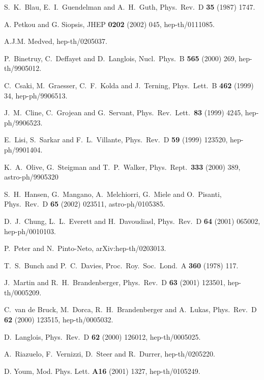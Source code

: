 \documentclass[a4paper,11pt]{article}
\begin{document}
\begin{thebibliography}{99}
S.~K.~Blau, E.~I.~Guendelman and A.~H.~Guth, Phys.\ Rev.\ D {\bf 35} (1987) 1747.

 A. Petkou and G. Siopsis, JHEP {\bf 0202} (2002) 045, 
hep-th/0111085.

 A.J.M. Medved, hep-th/0205037.

P.~Binetruy, C.~Deffayet and D.~Langlois,
Nucl.\ Phys.\ B {\bf 565} (2000) 269, hep-th/9905012.

C.~Csaki, M.~Graesser, C.~F.~Kolda and J.~Terning, Phys.\ Lett.\ B {\bf 462} (1999) 34, hep-ph/9906513.

J.~M.~Cline, C.~Grojean and G.~Servant, Phys.\ Rev.\ Lett.\ {\bf 83} (1999) 4245, hep-ph/9906523.

E.~Lisi, S.~Sarkar and F.~L.~Villante,
Phys.\ Rev.\ D {\bf 59} (1999) 123520, hep-ph/9901404.

K.~A.~Olive, G.~Steigman and T.~P.~Walker,
Phys.\ Rept.\  {\bf 333} (2000) 389, astro-ph/9905320

S.~H.~Hansen, G.~Mangano, A.~Melchiorri, G.~Miele and O.~Pisanti,
Phys.\ Rev.\ D {\bf 65} (2002) 023511, astro-ph/0105385.

D.~J.~Chung, L.~L.~Everett and H.~Davoudiasl, Phys.\ Rev.\ D {\bf 64}
(2001) 065002, hep-ph/0010103.

P.~Peter and N.~Pinto-Neto,
arXiv:hep-th/0203013.

T.~S.~Bunch and P.~C.~Davies,
Proc.\ Roy.\ Soc.\ Lond.\ A {\bf 360} (1978) 117.

J.~Martin and R.~H.~Brandenberger,
Phys.\ Rev.\ D {\bf 63} (2001) 123501, hep-th/0005209.

C.~van de Bruck, M.~Dorca, R.~H.~Brandenberger and A.~Lukas,
Phys.\ Rev.\ D {\bf 62} (2000) 123515, hep-th/0005032.

D.~Langlois,
Phys.\ Rev.\ D {\bf 62} (2000) 126012, hep-th/0005025.

A.~Riazuelo, F.~Vernizzi, D.~Steer and R.~Durrer,
hep-th/0205220.

 D. Youm, Mod. Phys. Lett. {\bf A16} (2001) 1327, 
hep-th/0105249.




\end{thebibliography}
\end{document}
